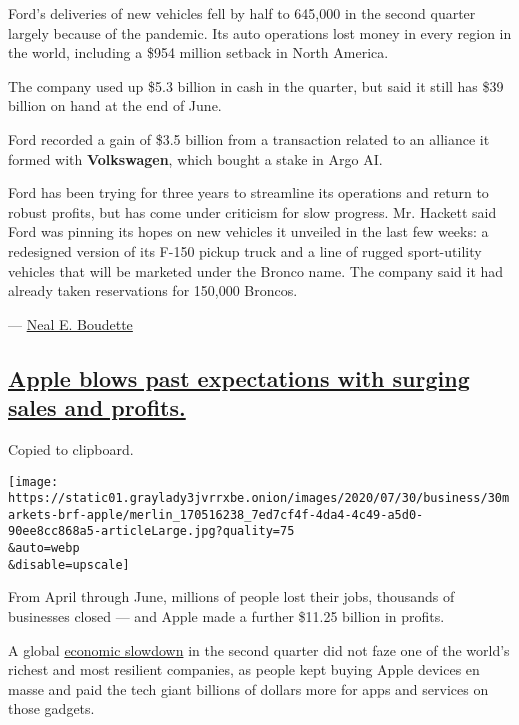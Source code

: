 Ford's deliveries of new vehicles fell by half to 645,000 in the second
quarter largely because of the pandemic. Its auto operations lost money
in every region in the world, including a \$954 million setback in North
America.

The company used up \$5.3 billion in cash in the quarter, but said it
still has \$39 billion on hand at the end of June.

Ford recorded a gain of \$3.5 billion from a transaction related to an
alliance it formed with \textbf{Volkswagen}, which bought a stake in
Argo AI.

Ford has been trying for three years to streamline its operations and
return to robust profits, but has come under criticism for slow
progress. Mr. Hackett said Ford was pinning its hopes on new vehicles it
unveiled in the last few weeks: a redesigned version of its F-150 pickup
truck and a line of rugged sport-utility vehicles that will be marketed
under the Bronco name. The company said it had already taken
reservations for 150,000 Broncos.

--- \href{https://www.nytimes3xbfgragh.onion/by/neal-e-boudette}{Neal E.
Boudette}

\hypertarget{apple-blows-past-expectations-with-surging-sales-and-profits}{%
\subsection{\texorpdfstring{\protect\hyperlink{apple-blows-past-expectations-with-surging-sales-and-profits}{Apple
blows past expectations with surging sales and
profits.}}{Apple blows past expectations with surging sales and profits.}}\label{apple-blows-past-expectations-with-surging-sales-and-profits}}

Copied to clipboard.

\texttt{[image: https://static01.graylady3jvrrxbe.onion/images/2020/07/30/business/30markets-brf-apple/merlin\_170516238\_7ed7cf4f-4da4-4c49-a5d0-90ee8cc868a5-articleLarge.jpg?quality=75\\\&auto=webp\\\&disable=upscale]}

From April through June, millions of people lost their jobs, thousands
of businesses closed --- and Apple made a further \$11.25 billion in
profits.

A global
\href{https://www.nytimes3xbfgragh.onion/live/2020/07/30/business/stock-market-today-coronavirus/the-us-economys-contraction-in-the-second-quarter-was-the-worst-on-record}{economic
slowdown} in the second quarter did not faze one of the world's richest
and most resilient companies, as people kept buying Apple devices en
masse and paid the tech giant billions of dollars more for apps and
services on those gadgets.

